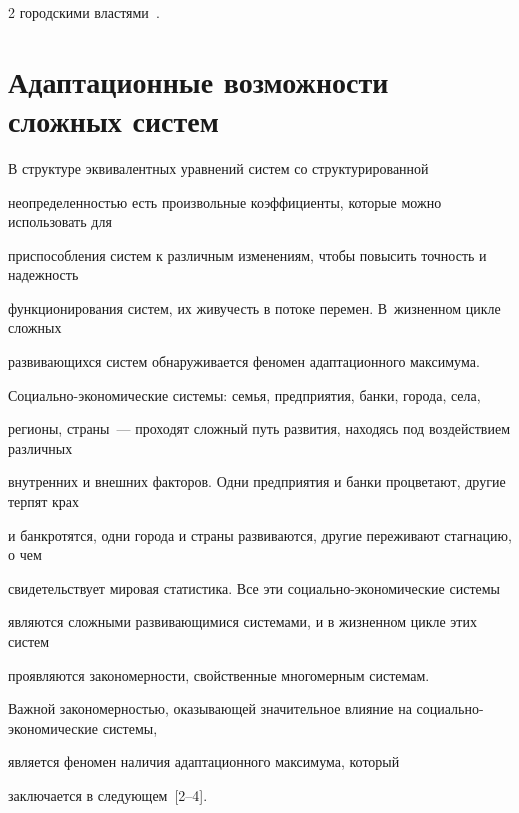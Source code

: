 \begin{multicols}{2}
городскими властями~\cite{45-ign}.


      





\section{Адаптационные возможности сложных систем}





      В структуре эквивалентных уравнений систем со структурированной 


неопределенностью есть произвольные коэффициенты, которые можно использовать для 


приспособления систем к различным изменениям, чтобы повысить точность и надежность 


функционирования систем, их живучесть в потоке перемен. В~жизненном цикле сложных 


раз\-ви\-ва\-ющих\-ся сис\-тем обнаруживается феномен адаптационного максимума.


      


      Социально-экономические сис\-те\-мы: семья, предприятия, банки, города, села, 


регионы, страны~--- проходят сложный путь развития, находясь под воздействием различных 


внутренних и внешних факторов. Одни предприятия и банки процветают, другие терпят крах 


и банкротятся, одни города и страны развиваются, другие переживают стагнацию, о чем 


свидетельствует мировая статистика. Все эти со\-ци\-аль\-но-эко\-но\-ми\-че\-ские сис\-те\-мы 


являются сложными развивающимися сис\-те\-мами, и в жизненном цикле этих систем 


проявляются закономерности, свойственные многомерным сис\-темам.


      


      Важной закономерностью, оказывающей значительное влияние на социально-экономические сис\-темы, 


      является феномен наличия адап\-та\-ци\-он\-но\-го максимума, который 


заключается в следу\-ющем~[2--4]. 


      



\end{multicols}
